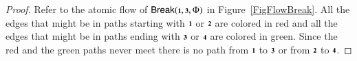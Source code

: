 \documentclass[a4paper]{amsart}
\theoremstyle{definition}
\theoremstyle{remark}
\newtheorem{remark}[theorem]{Remark}
\begin{document}
\begin{proof}
Refer to the atomic flow of $\Break(\one,\three,\Phi)$ in Figure~\ref{FigFlowBreak}.
All the edges that might be in paths starting with $\one$ or $\two$ are colored in red and all the edges that might be in paths ending with $\three$ or $\four$ are colored in green. Since the red and the green paths never meet there is no path from $\one$ to $\three$ or from $\two$ to $\four$.
\end{proof}
\end{document}
